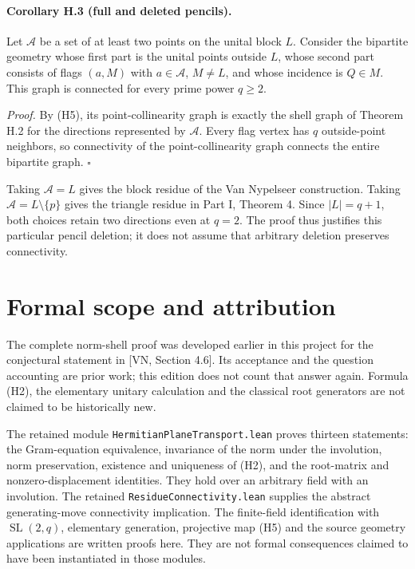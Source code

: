 \paragraph{Corollary H.3 (full and deleted pencils).}
Let $\mathcal A$ be a set of at least two points on the unital
block $L$. Consider the bipartite geometry whose first part is
the unital points outside $L$, whose second part consists of
flags $(a,M)$ with $a\in\mathcal A$, $M\ne L$, and whose
incidence is $Q\in M$. This graph is connected for every prime
power $q\geq2$.

\emph{Proof.}
By (H5), its point-collinearity graph is exactly the shell graph
of Theorem H.2 for the directions represented by $\mathcal A$.
Every flag vertex has $q$ outside-point neighbors, so connectivity
of the point-collinearity graph connects the entire bipartite
graph. \hfill$\square$

Taking $\mathcal A=L$ gives the block residue of the Van Nypelseer
construction. Taking $\mathcal A=L\setminus\{p\}$ gives the
triangle residue in Part I, Theorem 4. Since $|L|=q+1$, both choices
retain two directions even at $q=2$. The proof thus justifies this
particular pencil deletion; it does not assume that arbitrary
deletion preserves connectivity.

\section{Formal scope and attribution}

The complete norm-shell proof was developed earlier in this project
for the conjectural statement in [VN, Section 4.6]. Its acceptance
and the question accounting are prior work; this edition does not
count that answer again. Formula (H2), the elementary unitary
calculation and the classical root generators are not claimed to
be historically new.

The retained module \texttt{HermitianPlaneTransport.lean} proves
thirteen statements: the Gram-equation equivalence, invariance of
the norm under the involution, norm preservation, existence and
uniqueness of (H2), and the root-matrix and nonzero-displacement
identities. They hold over an arbitrary field with an involution.
The retained \texttt{ResidueConnectivity.lean} supplies the abstract
generating-move connectivity implication. The finite-field
identification with $\operatorname{SL}(2,q)$, elementary generation,
projective map (H5) and the source geometry applications are
written proofs here. They are not formal consequences claimed to
have been instantiated in those modules.
